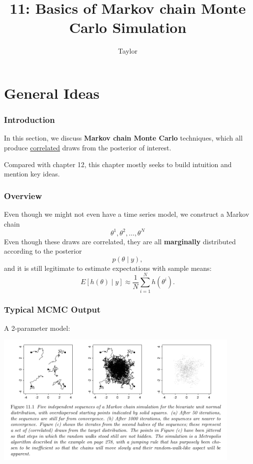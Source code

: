 \documentclass{beamer}
\title["11"]{11: Basics of Markov chain Monte Carlo Simulation}
\author{Taylor}
\institute[UVA] 
{
University of Virginia \\
\medskip
\textit{} 
}
\date{}
\begin{document}

\begin{frame}
\titlepage 
\end{frame}

\section{General Ideas}
\begin{frame}
\frametitle{Introduction}

In this section, we discuss {\bf Markov chain Monte Carlo} techniques, which all produce \underline{correlated} draws from the posterior of interest.
\newline

Compared with chapter 12, this chapter mostly seeks to build intuition and mention key ideas.


\end{frame}

\begin{frame}
\frametitle{Overview}

Even though we might not even have a time series model, we construct a Markov chain 
$$
\theta^1, \theta^2, \ldots, \theta^N
$$
Even though these draws are correlated, they are all {\bf marginally} distributed according to the posterior 
$$
p(\theta \mid y),
$$
and it is still legitimate to estimate expectations with sample means:
$$
E[h(\theta) \mid y] \approx  \frac{1}{N}\sum_{i=1}^N h(\theta^i).
$$
\end{frame}

\begin{frame}
\frametitle{Typical MCMC Output}

A 2-parameter model:
\begin{center}
\includegraphics[width=120mm]{fig11.png}
\end{center}

\end{frame}
\end{document}
